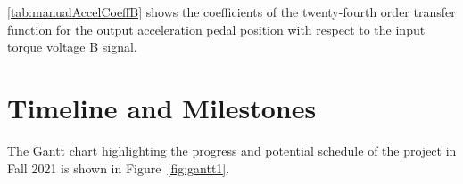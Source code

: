 \documentclass[letterpaper,12pt]{article}   %
\begin{document}
\noindent \autoref{tab:manualAccelCoeffB} shows the coefficients of the twenty-fourth order transfer function for the output acceleration pedal position with respect to the input torque voltage B signal.%
%
\begin{table}[hbtp]
	\caption{Manual Mode Acceleration Transfer Function Torque Voltage B Coefficient Table}
	\label{tab:manualAccelCoeffB}
  \centering
    \begin{center}
    \end{center}	
\end{table}
%


\section{Timeline and Milestones} \label{sec:timeline}


The Gantt chart highlighting the progress and potential schedule of the project in Fall 2021 is shown in Figure~\ref{fig:gantt1}.  
\end{document}
